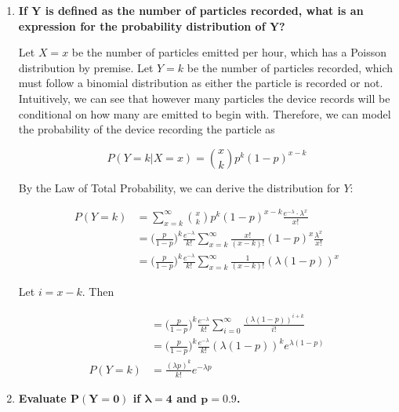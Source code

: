 \documentclass[10pt, oneside]{article}   	%
\theoremstyle{definition}
\begin{document}
\begin{enumerate}[label=8.\arabic*]
	\begin{enumerate}
	\item  \begin{tcolorbox}[
	  colback=Cerulean!5!white,
	  colframe=Cerulean!75!black]
	\textbf{If $\bm{Y}$ is defined as the number of particles recorded, what is an expression for the probability distribution of $\bm{Y}$?}
	\end{tcolorbox}
	
	Let $X = x$ be the number of particles emitted per hour, which has a Poisson distribution by premise. Let $Y = k$ be the number of particles recorded, which must follow a binomial distribution as either the particle is recorded or not. Intuitively, we can see that however many particles the device records will be conditional on how many are emitted to begin with. Therefore, we can model the probability of the device recording the particle as
	
	\[ P(Y = k | X = x) = \binom{x}{k} p^k (1-p)^{x-k} \]
	
	By the Law of Total Probability, we can derive the distribution for $Y$:
	
	\begin{align*}
	P(Y = k) &= \sum^{\infty}_{x=k} \binom{x}{k} p^k (1-p)^{x-k} \frac{e^{-\lambda} \cdot \lambda^x}{x!} \\
	&= \Big( \frac{p}{1-p} \Big)^k \frac{e^{-\lambda}}{k!} \sum^{\infty}_{x=k} \frac{x!}{(x-k)!} (1-p)^x \frac{\lambda^x}{x!} \\
	&= \Big( \frac{p}{1-p} \Big)^k \frac{e^{-\lambda}}{k!} \sum^{\infty}_{x=k} \frac{1}{(x-k)!} (\lambda (1-p))^x
	\end{align*}
	
	Let $i = x - k$. Then
	
	\begin{align*}
	&= \Big( \frac{p}{1-p} \Big)^k \frac{e^{-\lambda}}{k!} \sum^{\infty}_{i=0} \frac{(\lambda (1-p))^{i + k}}{i!} \\
	&= \Big( \frac{p}{1-p} \Big)^k \frac{e^{-\lambda}}{k!} (\lambda (1-p))^k e^{\lambda (1-p)} \\
	P(Y = k) &= \boxed{ \frac{(\lambda p)^k}{k!} e^{-\lambda p} }
	\end{align*}
	
	\item  \begin{tcolorbox}[
	  colback=Cerulean!5!white,
	  colframe=Cerulean!75!black]
	\textbf{Evaluate $\bm{P(Y = 0)}$ if $\bm{\lambda = 4}$ and $\bm{p = 0.9}$.}
	\end{tcolorbox}
	

\end{enumerate}
\end{enumerate}
\end{document}

